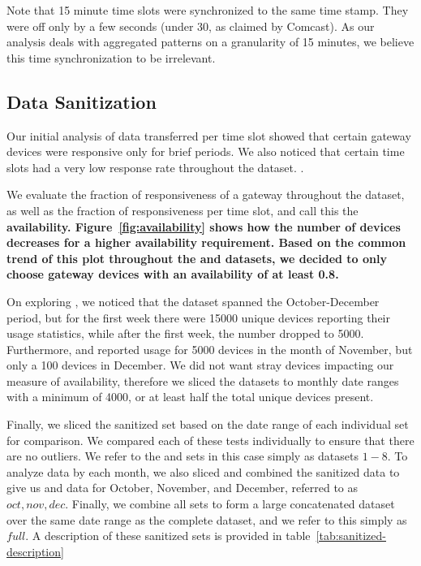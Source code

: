 Note that 15 minute time slots were synchronized to the same time stamp. They were off only by a few seconds (under 30, as claimed by Comcast). As our analysis deals with aggregated patterns on a granularity of 15 minutes, we believe this time synchronization to be irrelevant.

\subsection{Data Sanitization}

Our initial analysis of data transferred per time slot showed that certain gateway devices were responsive only for brief periods. We also noticed that certain time slots had a very low response rate throughout the dataset. .

We evaluate the fraction of responsiveness of a gateway throughout the dataset, as well as the fraction of responsiveness per time slot, and call this the \bf{availability}. Figure~\ref{fig:availability} shows how the number of devices decreases for a higher availability requirement. Based on the common trend of this plot throughout the \test and \control datasets, we decided to only choose gateway devices with an availability of at least 0.8.

On exploring , we noticed that the dataset spanned the October-December period, but for the first week there were 15000 unique devices reporting their usage statistics, while after the first week, the number dropped to 5000. Furthermore,  and  reported usage for 5000 devices in the month of November, but only a 100 devices in December. We did not want stray devices impacting our measure of availability, therefore we sliced the \control datasets to monthly date ranges with a minimum of 4000, or at least half the total unique devices present.

Finally, we sliced the sanitized \test set based on the date range of each individual \control set for comparison. We compared each of these tests individually to ensure that there are no outliers. We refer to the \test and \control sets in this case simply as datasets $1-8$. To analyze data by each month, we also sliced and combined the sanitized data to give us \control and \test data for October, November, and December, referred to as $oct, nov, dec$. Finally, we combine all \control sets to form a large concatenated dataset over the same date range as the complete \test dataset, and we refer to this simply as $full$. A description of these sanitized sets is provided in table~\ref{tab:sanitized-description} 



